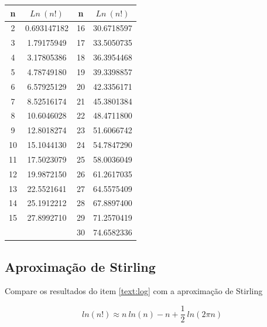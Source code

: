 \documentclass[a4paper, 12pt]{article}
\begin{document}
\begin{table}[H]
\centering
\begin{tabular}{ c | c | c | c  }
	n &  $Ln \: (n!)$ & n & $Ln \: (n!)$\\ \hline
	2 &   0.693147182     & 16 &    30.6718597     \\ \hline
	3 &    1.79175949     & 17 &    33.5050735     \\ \hline
	4 &    3.17805386     & 18 &    36.3954468     \\ \hline
	5 &    4.78749180     & 19 &    39.3398857     \\ \hline
	6 &    6.57925129     & 20 &    42.3356171     \\ \hline
	7 &    8.52516174     & 21 &    45.3801384     \\ \hline
	8 &    10.6046028     & 22 &    48.4711800     \\ \hline
	9 &    12.8018274     & 23 &    51.6066742     \\ \hline
	10 &    15.1044130     & 24 &    54.7847290     \\ \hline
	11 &    17.5023079     & 25 &    58.0036049     \\ \hline
	12 &    19.9872150     & 26 &    61.2617035     \\ \hline
	13 &    22.5521641     & 27 &    64.5575409     \\ \hline
	14 &    25.1912212     & 28 &    67.8897400     \\ \hline
	15 &    27.8992710     & 29 &    71.2570419     \\ \hline
	\ &      \   & 30  & 74.6582336
\end{tabular}
\end{table}

\subsection{Aproximação de Stirling}

Compare os resultados do item \ref{text:log} com a aproximação de Stirling

\begin{equation*} %
	ln (n!) \approx  n \:ln (n) - n + \frac{1}{2}\:ln(2 \pi  n)
\end{equation*}
\end{document}
